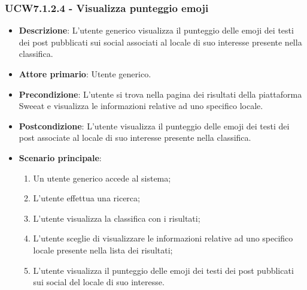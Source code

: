 \subsubsection{UCW7.1.2.4 - Visualizza punteggio emoji}
\begin{itemize}
	\item \textbf{Descrizione}: L'utente generico visualizza il punteggio delle emoji dei testi dei post pubblicati sui social associati al locale di suo interesse presente nella classifica.
    \item \textbf{Attore primario}: Utente generico.
    \item \textbf{Precondizione}: L’utente si trova nella pagina dei risultati della piattaforma Sweeat e visualizza le informazioni relative ad uno specifico locale.
    \item \textbf{Postcondizione}: L’utente visualizza il punteggio delle emoji dei testi dei post associate al locale di suo interesse presente nella classifica.
    \item \textbf{Scenario principale}: 
    \begin{enumerate}
        \item Un utente generico accede al sistema;
        \item L’utente effettua una ricerca;
        \item L'utente visualizza la classifica con i risultati;
        \item L'utente sceglie di visualizzare le informazioni relative ad uno specifico locale presente nella lista dei risultati;
        \item L'utente visualizza il punteggio delle emoji dei testi dei post pubblicati sui social del locale di suo interesse.
    \end{enumerate}
\end{itemize}

